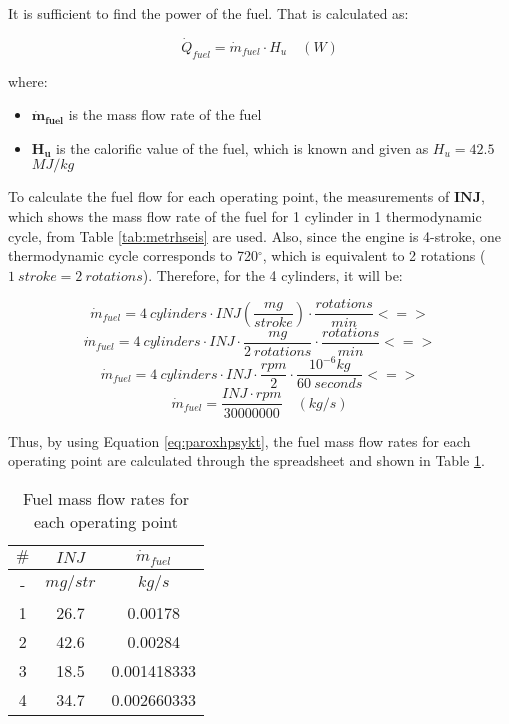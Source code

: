 \documentclass{report}
\begin{document}
It is sufficient to find the power of the fuel. That is calculated as:

\begin{equation}
    \label{eq:q.fuel}
    \dot{Q}_{fuel} = \dot{m}_{fuel} \cdot H_u \quad (W)
\end{equation}

where:
\begin{itemize}
    \item $\boldsymbol{\dot{m}_{fuel}}$ is the mass flow rate of the fuel
    \item $\boldsymbol{H_u}$ is the calorific value of the fuel, which is known and given as $H_u = 42.5$ $MJ/kg$
\end{itemize}

To calculate the fuel flow for each operating point, the measurements of $\boldsymbol{INJ}$, which shows the mass flow rate of the fuel for 1 cylinder in 1 thermodynamic cycle, from Table \ref{tab:metrhseis} are used. Also, since the engine is 4-stroke, one thermodynamic cycle corresponds to 720$^\circ$, which is equivalent to 2 rotations ($1\:stroke = 2\:rotations$). Therefore, for the 4 cylinders, it will be:

$$\dot{m}_{fuel} = 4\:cylinders \cdot INJ (\frac{mg}{stroke}) \cdot \frac{rotations}{min} <=>$$
$$\dot{m}_{fuel} = 4\:cylinders \cdot INJ \cdot \frac{mg}{2\:rotations} \cdot \frac{rotations}{min} <=>$$
$$\dot{m}_{fuel} = 4\:cylinders \cdot INJ \cdot \frac{rpm}{2} \cdot \frac{10^{-6}kg}{60\:seconds} <=>$$
\begin{equation}
    \label{eq:paroxhpsykt}
    \dot{m}_{fuel} = \frac{INJ \cdot rpm}{30000000} \quad (kg/s)
\end{equation}

Thus, by using Equation \ref{eq:paroxhpsykt}, the fuel mass flow rates for each operating point are calculated through the spreadsheet and shown in Table \ref{tab:m.fuel}.

\begin{table}[H]
    \centering
    \renewcommand{\arraystretch}{1.2} 
    \begin{tabular}{|c|c|c|}
    \hline
    \rowcolor{blue}
    $\#$ & $INJ$ & $\dot{m}_{fuel}$\\
    \hline
    \rowcolor{gray}
    - & $mg/str$ & $kg/s$\\
    \hline
    1 & 26.7 & 0.00178\\
    \hline
    2 & 42.6 & 0.00284\\
    \hline
    3 & 18.5 & 0.001418333\\
    \hline
    4 & 34.7 & 0.002660333\\
    \hline 
    \end{tabular}
    \caption{Fuel mass flow rates for each operating point}
    \label{tab:m.fuel}
\end{table}
\end{document}
